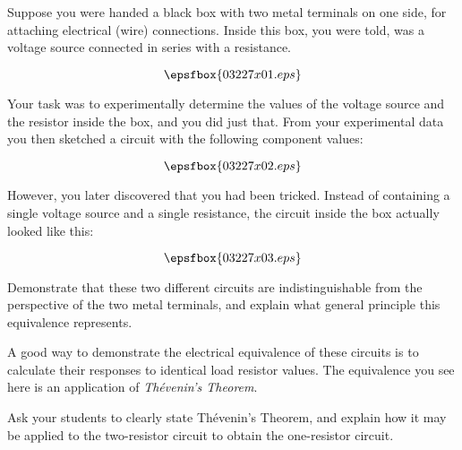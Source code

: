 

Suppose you were handed a black box with two metal terminals on one side, for attaching electrical (wire) connections.  Inside this box, you were told, was a voltage source connected in series with a resistance.

$$\epsfbox{03227x01.eps}$$

Your task was to experimentally determine the values of the voltage source and the resistor inside the box, and you did just that.  From your experimental data you then sketched a circuit with the following component values:

$$\epsfbox{03227x02.eps}$$

However, you later discovered that you had been tricked.  Instead of containing a single voltage source and a single resistance, the circuit inside the box actually looked like this:

$$\epsfbox{03227x03.eps}$$

Demonstrate that these two different circuits are indistinguishable from the perspective of the two metal terminals, and explain what general principle this equivalence represents.







A good way to demonstrate the electrical equivalence of these circuits is to calculate their responses to identical load resistor values.  The equivalence you see here is an application of {\it Th\'evenin's Theorem}.







Ask your students to clearly state Th\'evenin's Theorem, and explain how it may be applied to the two-resistor circuit to obtain the one-resistor circuit.




